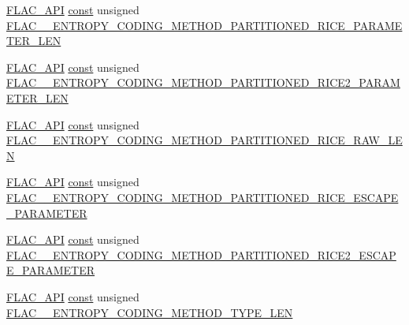 \begin{DoxyCompactItemize}
\item 
\hyperlink{group__flac__export_ga56ca07df8a23310707732b1c0007d6f5}{F\+L\+A\+C\+\_\+\+A\+PI} \hyperlink{getopt1_8c_a2c212835823e3c54a8ab6d95c652660e}{const} unsigned \hyperlink{group__flac__format_ga1b66dd050e207a941555dd1a5dd184d3}{F\+L\+A\+C\+\_\+\+\_\+\+E\+N\+T\+R\+O\+P\+Y\+\_\+\+C\+O\+D\+I\+N\+G\+\_\+\+M\+E\+T\+H\+O\+D\+\_\+\+P\+A\+R\+T\+I\+T\+I\+O\+N\+E\+D\+\_\+\+R\+I\+C\+E\+\_\+\+P\+A\+R\+A\+M\+E\+T\+E\+R\+\_\+\+L\+EN}
\item 
\hyperlink{group__flac__export_ga56ca07df8a23310707732b1c0007d6f5}{F\+L\+A\+C\+\_\+\+A\+PI} \hyperlink{getopt1_8c_a2c212835823e3c54a8ab6d95c652660e}{const} unsigned \hyperlink{group__flac__format_ga9266ba16c700a7c7600d7ed57a1b0d8e}{F\+L\+A\+C\+\_\+\+\_\+\+E\+N\+T\+R\+O\+P\+Y\+\_\+\+C\+O\+D\+I\+N\+G\+\_\+\+M\+E\+T\+H\+O\+D\+\_\+\+P\+A\+R\+T\+I\+T\+I\+O\+N\+E\+D\+\_\+\+R\+I\+C\+E2\+\_\+\+P\+A\+R\+A\+M\+E\+T\+E\+R\+\_\+\+L\+EN}
\item 
\hyperlink{group__flac__export_ga56ca07df8a23310707732b1c0007d6f5}{F\+L\+A\+C\+\_\+\+A\+PI} \hyperlink{getopt1_8c_a2c212835823e3c54a8ab6d95c652660e}{const} unsigned \hyperlink{group__flac__format_gac4552a7a6b9c771ee47ee51fa998ca5f}{F\+L\+A\+C\+\_\+\+\_\+\+E\+N\+T\+R\+O\+P\+Y\+\_\+\+C\+O\+D\+I\+N\+G\+\_\+\+M\+E\+T\+H\+O\+D\+\_\+\+P\+A\+R\+T\+I\+T\+I\+O\+N\+E\+D\+\_\+\+R\+I\+C\+E\+\_\+\+R\+A\+W\+\_\+\+L\+EN}
\item 
\hyperlink{group__flac__export_ga56ca07df8a23310707732b1c0007d6f5}{F\+L\+A\+C\+\_\+\+A\+PI} \hyperlink{getopt1_8c_a2c212835823e3c54a8ab6d95c652660e}{const} unsigned \hyperlink{group__flac__format_ga176b89e2ee2e08d0790bfbab2fa213a0}{F\+L\+A\+C\+\_\+\+\_\+\+E\+N\+T\+R\+O\+P\+Y\+\_\+\+C\+O\+D\+I\+N\+G\+\_\+\+M\+E\+T\+H\+O\+D\+\_\+\+P\+A\+R\+T\+I\+T\+I\+O\+N\+E\+D\+\_\+\+R\+I\+C\+E\+\_\+\+E\+S\+C\+A\+P\+E\+\_\+\+P\+A\+R\+A\+M\+E\+T\+ER}
\item 
\hyperlink{group__flac__export_ga56ca07df8a23310707732b1c0007d6f5}{F\+L\+A\+C\+\_\+\+A\+PI} \hyperlink{getopt1_8c_a2c212835823e3c54a8ab6d95c652660e}{const} unsigned \hyperlink{group__flac__format_ga08bc0c9e0fd088cbea13bc3b11c4d4d4}{F\+L\+A\+C\+\_\+\+\_\+\+E\+N\+T\+R\+O\+P\+Y\+\_\+\+C\+O\+D\+I\+N\+G\+\_\+\+M\+E\+T\+H\+O\+D\+\_\+\+P\+A\+R\+T\+I\+T\+I\+O\+N\+E\+D\+\_\+\+R\+I\+C\+E2\+\_\+\+E\+S\+C\+A\+P\+E\+\_\+\+P\+A\+R\+A\+M\+E\+T\+ER}
\item 
\hyperlink{group__flac__export_ga56ca07df8a23310707732b1c0007d6f5}{F\+L\+A\+C\+\_\+\+A\+PI} \hyperlink{getopt1_8c_a2c212835823e3c54a8ab6d95c652660e}{const} unsigned \hyperlink{group__flac__format_ga1d49716deb8775a027f78b059b61c2e0}{F\+L\+A\+C\+\_\+\+\_\+\+E\+N\+T\+R\+O\+P\+Y\+\_\+\+C\+O\+D\+I\+N\+G\+\_\+\+M\+E\+T\+H\+O\+D\+\_\+\+T\+Y\+P\+E\+\_\+\+L\+EN}

\end{DoxyCompactItemize}
